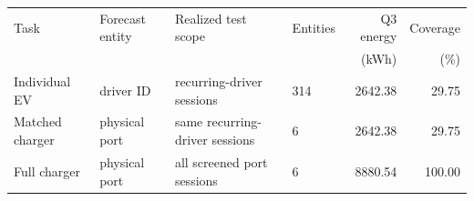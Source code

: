 \begin{tabular}{llllrr}
\toprule
Task & Forecast entity & Realized test scope & Entities & Q3 energy & Coverage \\
 & & & & (kWh) & (\%) \\
\midrule
Individual EV & driver ID & recurring-driver sessions & 314 & 2642.38 & 29.75 \\
Matched charger & physical port & same recurring-driver sessions & 6 & 2642.38 & 29.75 \\
Full charger & physical port & all screened port sessions & 6 & 8880.54 & 100.00 \\
\bottomrule
\end{tabular}
